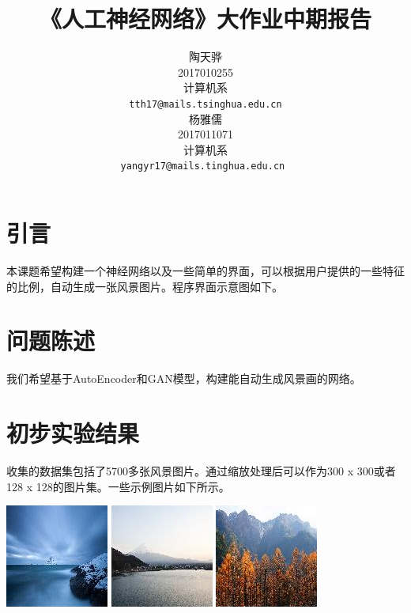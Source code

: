 \documentclass{article}
\title{《人工神经网络》大作业中期报告}
\author{%
  陶天骅 \\
  2017010255 \\
  计算机系 \\
  \texttt{tth17@mails.tsinghua.edu.cn} \\
  \And
  杨雅儒\\
  2017011071 \\
  计算机系 \\
  \texttt{yangyr17@mails.tinghua.edu.cn
  } \\
}
\begin{document}
\begin{CJK*}{UTF8}{gbsn}
\maketitle


\section{引言}

本课题希望构建一个神经网络以及一些简单的界面，可以根据用户提供的一些特征的比例，自动生成一张风景图片。程序界面示意图如下。

\section{问题陈述}

我们希望基于AutoEncoder和GAN模型，构建能自动生成风景画的网络。

\section{初步实验结果}

收集的数据集包括了5700多张风景图片。通过缩放处理后可以作为300 x 300或者128 x 128的图片集。一些示例图片如下所示。

\includegraphics{./data1.jpg}
\includegraphics{./data2.jpg}
\includegraphics{./data3.jpg}


\end{CJK*}
\end{document}
